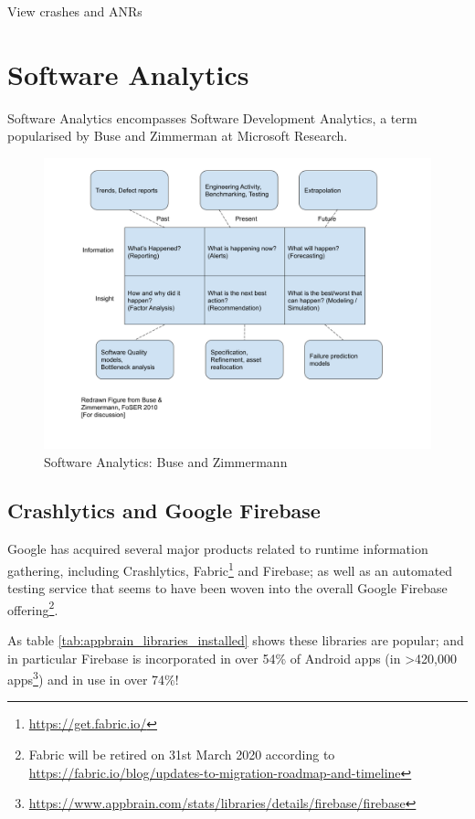 View crashes and ANRs\cite{play_console_help_view_crashes_2019}

\section{Software Analytics}
Software Analytics encompasses Software Development Analytics, a term popularised by Buse and Zimmerman at Microsoft Research\cite{buse_analytics_2010}.

\begin{figure}
    \centering
    \includegraphics[width=\textwidth]{images/Buse_and_Zimmermann_2010_figure.png}
    \caption{Software Analytics: Buse and Zimmermann}
    \label{fig:buse_and_zimmermann_2010_figure}
\end{figure}

\subsection{Crashlytics and Google Firebase}
Google has acquired several major products related to runtime information gathering, including Crashlytics, Fabric\footnote{\url{https://get.fabric.io/}} and Firebase; as well as an automated testing service that seems to have been woven into the overall Google Firebase offering\footnote{Fabric will be retired on 31st March 2020 according to \\ \url{https://fabric.io/blog/updates-to-migration-roadmap-and-timeline}}. 

As table \ref{tab:appbrain_libraries_installed} shows these libraries are popular; and in particular Firebase is incorporated in over 54\% of Android apps (in >420,000 apps\footnote{\url{https://www.appbrain.com/stats/libraries/details/firebase/firebase}}) and in use in over 74\%!


